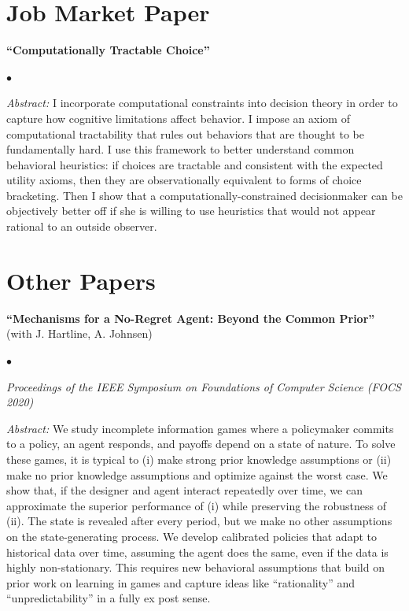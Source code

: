\documentclass[margin,line]{res}
\newenvironment{list1}{
  \begin{list}{\ding{113}}{%
      \setlength{\itemsep}{.025in}
      \setlength{\parsep}{0in} \setlength{\parskip}{0in}
      \setlength{\topsep}{0in} \setlength{\partopsep}{0in}
      \setlength{\leftmargin}{0.17in}}}{\end{list}}
\newenvironment{list2}{
  \begin{list}{$\bullet$}{%
      \setlength{\itemsep}{0in}
      \setlength{\parsep}{0in} \setlength{\parskip}{0in}
      \setlength{\topsep}{0in} \setlength{\partopsep}{0in}
      \setlength{\leftmargin}{0.2in}}}{\end{list}}
\begin{document}
\begin{resume}
\section{Job Market Paper}
\begin{list1}
\item[] \textbf{``Computationally Tractable Choice''}
\vspace*{.05in}
	\begin{list2}
		\item[] \textit{Abstract:} 
		I incorporate computational constraints into decision theory in order to capture how cognitive limitations affect behavior.
		I impose an axiom of computational tractability that rules out behaviors that are thought to be fundamentally hard. 
		I use this framework to better understand common behavioral heuristics: if choices are tractable and consistent with the expected utility axioms, then they are observationally equivalent to forms of choice bracketing.
		Then I show that a computationally-constrained decisionmaker can be objectively better off if she is willing to use heuristics that would not appear rational to an outside observer.
	\end{list2}
\end{list1}

\section{Other Papers}
\begin{list1}
\item[] \textbf{``Mechanisms for a No-Regret Agent: Beyond the Common Prior''} (with  J. Hartline, A. Johnsen)
\vspace*{.05in}
	\begin{list2}
		\item[] \textit{Proceedings of the IEEE Symposium on Foundations of Computer Science (FOCS 2020)}
		\vspace*{.05in}
		\item[] \textit{Abstract:} 
		We study incomplete information games where a policymaker commits to a policy, an agent responds, and payoffs depend on a state of nature.
		To solve these games, it is typical to (i) make strong prior knowledge assumptions or (ii) make no prior knowledge assumptions and optimize against the worst case.
		We show that, if the designer and agent interact repeatedly over time, we can approximate the superior performance of (i) while preserving the robustness of (ii).
		The state is revealed after every period, but we make no other assumptions on the state-generating process.
		We develop calibrated policies that adapt to historical data over time, assuming the agent does the same, even if the data is highly non-stationary.
		This requires new behavioral assumptions that build on prior work on learning in games and capture ideas like ``rationality'' and ``unpredictability'' in a fully ex post sense.
		

\end{list2}
\end{list1}
\end{resume}
\end{document}
